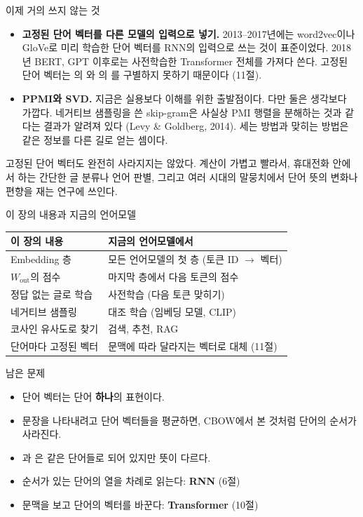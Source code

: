 \documentclass[aspectratio=169,11pt]{beamer}
\begin{document}
\begin{frame}{이제 거의 쓰지 않는 것}
\begin{itemize}
\item \textbf{고정된 단어 벡터를 다른 모델의 입력으로 넣기.}
2013--2017년에는 word2vec이나 GloVe로 미리 학습한 단어 벡터를 RNN의 입력으로 쓰는 것이 표준이었다.
2018년 BERT, GPT 이후로는 사전학습한 Transformer 전체를 가져다 쓴다.
고정된 단어 벡터는 의 와 의 를 구별하지 못하기 때문이다 (11절).
\item \textbf{PPMI와 SVD.}
지금은 실용보다 이해를 위한 출발점이다. 다만 둘은 생각보다 가깝다.
네거티브 샘플링을 쓴 skip-gram은 사실상 PMI 행렬을 분해하는 것과 같다는 결과가 알려져 있다 (Levy \& Goldberg, 2014).
세는 방법과 맞히는 방법은 같은 정보를 다른 길로 얻는 셈이다.
\end{itemize}
\vskip1mm
\begin{remarkbox}
고정된 단어 벡터도 완전히 사라지지는 않았다. 계산이 가볍고 빨라서, 휴대전화 안에서 하는 간단한 글 분류나 언어 판별,
그리고 여러 시대의 말뭉치에서 단어 뜻의 변화나 편향을 재는 연구에 쓰인다.
\end{remarkbox}
\end{frame}

\begin{frame}{이 장의 내용과 지금의 언어모델}
\centering
\begin{tabular}{@{}p{42mm}p{88mm}@{}}
\toprule
이 장의 내용 & 지금의 언어모델에서 \\
\midrule
Embedding 층 & 모든 언어모델의 첫 층 (토큰 ID $\to$ 벡터) \\
$W_{\text{out}}$의 점수 & 마지막 층에서 다음 토큰의 점수 \\
정답 없는 글로 학습 & 사전학습 (다음 토큰 맞히기) \\
네거티브 샘플링 & 대조 학습 (임베딩 모델, CLIP) \\
코사인 유사도로 찾기 & 검색, 추천, RAG \\
단어마다 고정된 벡터 & 문맥에 따라 달라지는 벡터로 대체 (11절) \\
\bottomrule
\end{tabular}
\end{frame}

\begin{frame}{남은 문제}
\begin{itemize}
\item 단어 벡터는 단어 \textbf{하나}의 표현이다.
\item 문장을 나타내려고 단어 벡터들을 평균하면, CBOW에서 본 것처럼 단어의 순서가 사라진다.
\item {}과 은 같은 단어들로 되어 있지만 뜻이 다르다.
\end{itemize}
\vskip2mm
\begin{keybox}[이 문제를 푸는 두 가지 방법]
\begin{itemize}
\item 순서가 있는 단어의 열을 차례로 읽는다: \textbf{RNN} (6절)
\item 문맥을 보고 단어의 벡터를 바꾼다: \textbf{Transformer} (10절)
\end{itemize}
\end{keybox}
\end{frame}
\end{document}
